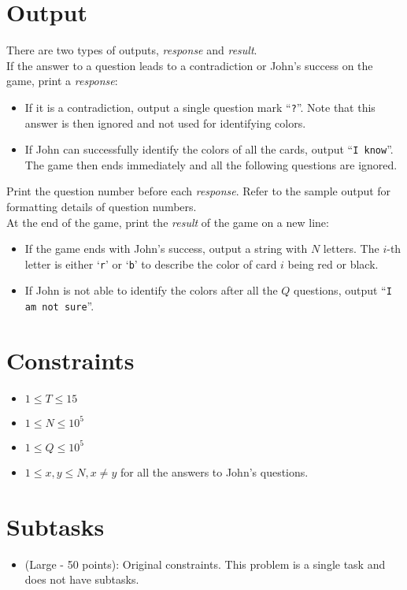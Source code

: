 \section*{Output}

There are two types of outputs, {\it response} and {\it result}.\\

If the answer to a question leads to a contradiction or John's success on the game, print a {\it response}:
\begin{itemize}
\item If it is a contradiction, output a single question mark ``{\tt ?}''.
Note that this answer is then ignored and not used for identifying colors.
\item If John can successfully identify the colors of all the cards, output ``{\tt I know}''.
The game then ends immediately and all the following questions are ignored.
\end{itemize}

Print the question number before each {\it response}.
Refer to the sample output for formatting details of question numbers.\\

At the end of the game, print the {\it result} of the game on a new line:
\begin{itemize}
\item If the game ends with John's success, output a string with $N$ letters.
The $i$-th letter is either `{\tt r}' or `{\tt b}' to describe the color of card $i$ being red or black.
\item If John is not able to identify the colors after all the $Q$ questions, output ``{\tt I am not sure}''.
\end{itemize}

\section*{Constraints}
\begin{itemize}
\item $1 \leq T\leq 15$
\item $1 \leq N \leq 10^5$
\item $1 \leq Q \leq 10^5$
\item $1\leq x, y \leq N, x \neq y$ for all the answers to John's questions.
\end{itemize}

\section*{Subtasks}
\begin{itemize}
\item (Large - 50 points): Original constraints. This problem is a single task and does not have subtasks.
\end{itemize}
